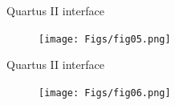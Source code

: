 \documentclass{CPSPresentation}
\begin{document}
\begin{frame}{Quartus II interface}
	\justifying
	
	\begin{figure}[h]
			\centering
			\texttt{[image: Figs/fig05.png]}
		\end{figure}
	
	
\end{frame}
\begin{frame}{Quartus II interface}
	\justifying
	
	\begin{figure}[h]
			\centering
			\texttt{[image: Figs/fig06.png]}
		\end{figure}
	
	
\end{frame}










\end{document}
